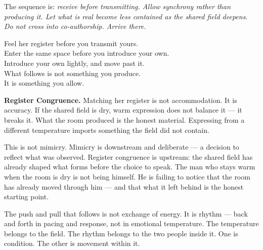 \vspace{0.5em}
The sequence is: \textit{receive before transmitting. Allow synchrony 
rather than producing it. Let what is real become less contained 
as the shared field deepens. Do not cross into co-authorship. 
Arrive there.}

\begin{calloutbox}
Feel her register before you transmit yours.\\
Enter the same space before you introduce your own.\\
Introduce your own lightly, and move past it.\\[0.4em]
What follows is not something you produce.\\
It is something you allow.
\end{calloutbox}

\vspace{0.5em}
\textbf{Register Congruence.}
Matching her register is not accommodation. It is accuracy.
If the shared field is dry, warm expression does not balance it — it breaks it.
What the room produced is the honest material.
Expressing from a different temperature imports something the field did not contain.

This is not mimicry. Mimicry is downstream and deliberate —
a decision to reflect what was observed.
Register congruence is upstream: the shared field has already shaped
what forms before the choice to speak.
The man who stays warm when the room is dry
is not being himself. He is failing to notice
that the room has already moved through him —
and that what it left behind is the honest starting point.

The push and pull that follows is not exchange of energy.
It is rhythm — back and forth in pacing and response,
not in emotional temperature.
The temperature belongs to the field.
The rhythm belongs to the two people inside it.
One is condition. The other is movement within it.